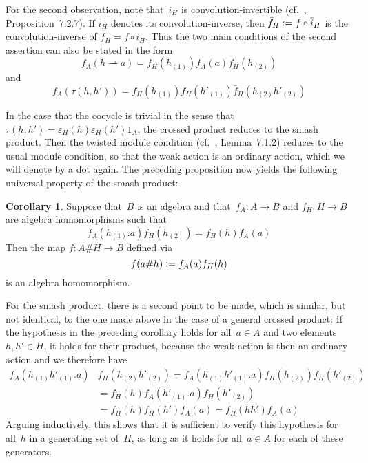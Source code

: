 \documentclass{article}
\numberwithin{equation}{section}
\theoremstyle{definition}
\newtheorem*{cor}{Corollary}
\theoremstyle{break}
\newcommand{\deq}{\vcentcolon =}
\newcommand{\1}{{(1)}}
\newcommand{\2}{{(2)}}
\newcommand{\3}{{(3)}}
\newcommand{\ra}{\rightarrow}
\newcommand{\eh}{{\varepsilon_{H}}}
\newcommand{\A}{1_A}
\begin{document}
For the second observation, note that~$i_H$ is convolution-invertible (cf.~\cite{M}, Proposition~7.2.7). If $\bar{i}_H$ denotes its convolution-inverse, then
$\bar{f}_H \deq f \circ \bar{i}_H$ is the convolution-inverse of
$f_H = f \circ i_H$. Thus  the two main conditions of the second assertion can also be stated in the form
$$f_A(h \rightharpoonup a) = f_H(h_\1) f_A(a) \bar{f}_H(h_\2)$$
and
$$f_A(\tau(h, h')) = f_H(h_\1) f_H(h'_\1) \bar{f}_H(h_\2 h'_\2)$$

In the case that the cocycle is trivial in the sense that $\tau(h, h') = \eh(h) \eh(h') \A$, the crossed product reduces to the smash product. Then the twisted module condition (cf.~\cite{M}, Lemma~7.1.2) reduces to the usual module condition, so that the weak action is an ordinary action, which we will denote by a dot again. The preceding proposition now yields the following universal property of the smash product:
\begin{cor}
Suppose that~$B$ is an algebra and that~$f_A \colon A \ra B$ and \mbox{$f_H \colon H \ra B$} are algebra homomorphisms such that
$$f_A(h_\1.a) f_H(h_\2) = f_H(h) f_A(a)$$
Then the map $f \colon A \# H \ra B$ defined via
$$f(a \# h) \deq f_A(a) f_H(h)$$
is an algebra homomorphism.
\end{cor}

For the smash product, there is a second point to be made, which is similar, but not identical, to the one made above in the case of a general crossed product: If the hypothesis in the preceding corollary holds for all~$a \in A$ and two elements~$h, h' \in H$, it holds for their product, because the weak action is then an ordinary action and we therefore have
\begin{align*}
f_A(h_\1 h'_\1.a) &f_H(h_\2 h'_\2) = f_A(h_\1 h'_\1.a) f_H(h_\2) f_H(h'_\2) \\
&= f_H(h) f_A(h'_\1.a) f_H(h'_\2) \\
&= f_H(h) f_H(h') f_A(a) = f_H(h h') f_A(a)
\end{align*}
Arguing inductively, this shows that it is sufficient to verify this hypothesis for all~$h$ in a generating set of~$H$, as long as it holds for all~$a \in A$ for each of these generators.
\end{document}
